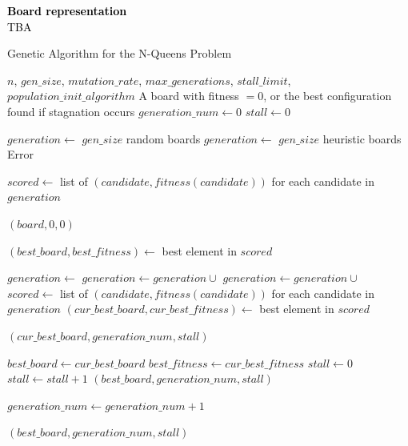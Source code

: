 \documentclass{scrartcl}
\begin{document}
\textcolor{black}{\textbf{Board representation \\} TBA}

\begin{algorithm}[H]
\caption{Genetic Algorithm for the N-Queens Problem}\label{alg:nqueens}
\begin{algorithmic}
\Require $n$, $gen\_size$, $mutation\_rate$, $max\_generations$, $stall\_limit$, $population\_init\_algorithm$
\Ensure A board with fitness $=0$, or the best configuration found if stagnation occurs
\State $generation\_num \gets 0$
\State $stall \gets 0$

    \State $generation \gets$ $gen\_size$ random boards
    \State $generation \gets$ $gen\_size$ heuristic boards
\Else
    \State \Return Error
\EndIf

\State $scored \gets$ list of $(candidate, fitness(candidate))$ for each candidate in $generation$

        \State \Return $(board, 0, 0)$ 
    \EndIf
\EndFor

\State $(best\_board, best\_fitness) \gets$ best element in $scored$

    \State $generation \gets$ 
    \State $generation \gets generation \cup$ 
    \State $generation \gets generation \cup$ 
    \State $scored \gets$ list of $(candidate, fitness(candidate))$ for each candidate in $generation$
    \State $(cur\_best\_board, cur\_best\_fitness) \gets$ best element in $scored$

        \State \Return $(cur\_best\_board, generation\_num, stall)$
    \EndIf

        \State $best\_board \gets cur\_best\_board$
        \State $best\_fitness \gets cur\_best\_fitness$
        \State $stall \gets 0$
    \Else
        \State $stall \gets stall + 1$
            \State \Return $(best\_board, generation\_num, stall)$
        \EndIf
    \EndIf

    \State $generation\_num \gets generation\_num + 1$
\EndWhile

\State \Return $(best\_board, generation\_num, stall)$
\end{algorithmic}
\end{algorithm}
\end{document}
